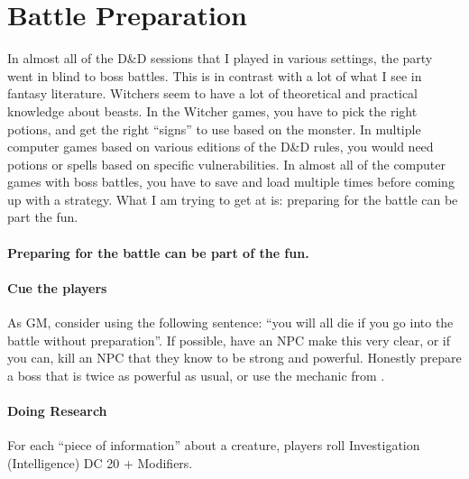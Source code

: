 \documentclass[twocolumn]{dndbook}
\begin{document}

\section{Battle Preparation}

In almost all of the D\&D sessions that I played in various settings, the party went in blind to boss battles.
This is in contrast with a lot of what I see in fantasy literature.
Witchers seem to have a lot of theoretical and practical knowledge about beasts.
In the Witcher games, you have to pick the right potions, and get the right ``signs'' to use based on the monster.
In multiple computer games based on various editions of the D\&D rules, you would need potions or spells based on specific vulnerabilities.
In almost all of the computer games with boss battles, you have to save and load multiple times before coming up with a strategy.
What I am trying to get at is: preparing for the battle can be part the fun.\par

\begin{emphasisParagraph}
	\paragraph*{Preparing for the battle can be part of the fun.}
\end{emphasisParagraph}

\paragraph*{Cue the players}
As GM, consider using the following sentence: ``you will all die if you go into the battle without preparation''.
If possible, have an NPC make this very clear, or if you can, kill an NPC that they know to be strong and powerful.
Honestly prepare a boss that is twice as powerful as usual, or use the mechanic from .\par

\paragraph*{Doing Research}

For each ``piece of information'' about a creature, players roll Investigation (Intelligence) DC 20 + Modifiers.

\end{document}
